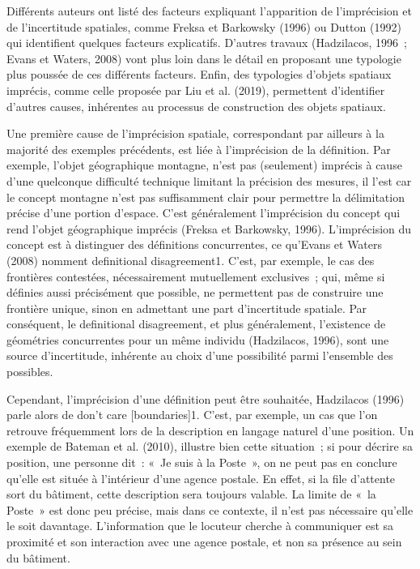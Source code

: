 Différents auteurs ont listé des facteurs expliquant l’apparition de
l’imprécision et de l’incertitude spatiales, comme Freksa et Barkowsky
(1996) ou Dutton (1992) qui identifient quelques facteurs
explicatifs. D’autres travaux (Hadzilacos, 1996 ; Evans et Waters,
2008) vont plus loin dans le détail en proposant une typologie plus
poussée de ces différents facteurs. Enfin, des typologies d’objets
spatiaux imprécis, comme celle proposée par Liu et al. (2019),
permettent d’identifier d’autres causes, inhérentes au processus de
construction des objets spatiaux.

Une première cause de l’imprécision spatiale, correspondant par
ailleurs à la majorité des exemples précédents, est liée à
l’imprécision de la définition. Par exemple, l’objet géographique
montagne, n’est pas (seulement) imprécis à cause d’une quelconque
difficulté technique limitant la précision des mesures, il l’est car
le concept montagne n’est pas suffisamment clair pour permettre la
délimitation précise d’une portion d’espace. C’est généralement
l’imprécision du concept qui rend l’objet géographique imprécis
(Freksa et Barkowsky, 1996). L’imprécision du concept est à distinguer
des définitions concurrentes, ce qu’Evans et Waters (2008) nomment
definitional disagreement1. C’est, par exemple, le cas des frontières
contestées, nécessairement mutuellement exclusives ; qui, même si
définies aussi précisément que possible, ne permettent pas de
construire une frontière unique, sinon en admettant une part
d’incertitude spatiale. Par conséquent, le definitional disagreement,
et plus généralement, l’existence de géométries concurrentes pour un
même individu (Hadzilacos, 1996), sont une source d’incertitude,
inhérente au choix d’une possibilité parmi l’ensemble des possibles.

Cependant, l’imprécision d’une définition peut être souhaitée,
Hadzilacos (1996) parle alors de don't care [boundaries]1. C’est, par
exemple, un cas que l’on retrouve fréquemment lors de la description
en langage naturel d’une position. Un exemple de Bateman et
al. (2010), illustre bien cette situation ; si pour décrire sa
position, une personne dit : « Je suis à la Poste », on ne peut pas en
conclure qu’elle est située à l’intérieur d’une agence postale. En
effet, si la file d’attente sort du bâtiment, cette description sera
toujours valable. La limite de « la Poste » est donc peu précise, mais
dans ce contexte, il n’est pas nécessaire qu’elle le soit
davantage. L’information que le locuteur cherche à communiquer est sa
proximité et son interaction avec une agence postale, et non sa
présence au sein du bâtiment.

